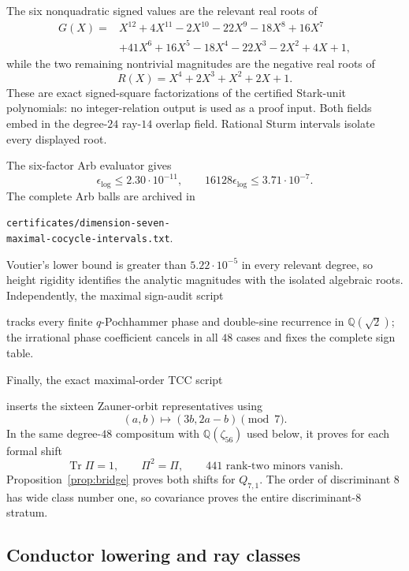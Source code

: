 \documentclass[11pt]{article}
\newcommand{\Tr}{\operatorname{Tr}}
\newcommand{\Q}{\mathbb Q}
\begin{document}
The six nonquadratic signed values are the relevant real roots of
\[
\begin{aligned}
G(X)={}&X^{12}+4X^{11}-2X^{10}-22X^9-18X^8+16X^7\\
 &+41X^6+16X^5-18X^4-22X^3-2X^2+4X+1,
\end{aligned}
\tag{6}
\]
while the two remaining nontrivial magnitudes are the negative real
roots of
\[
 R(X)=X^4+2X^3+X^2+2X+1.
\tag{7}
\]
These are exact signed-square factorizations of the certified
Stark-unit polynomials: no integer-relation output is used as a proof
input.  Both fields embed in the degree-$24$ ray-$14$ overlap field.
Rational Sturm intervals isolate every displayed root.

The six-factor Arb evaluator
 gives
\[
 \epsilon_{\log}\le2.30\cdot10^{-11},\qquad
 16128\epsilon_{\log}\le3.71\cdot10^{-7}.
\tag{8}
\]
The complete Arb balls are archived in
\begin{center}\small
\texttt{certificates/dimension-seven-}\\
\texttt{maximal-cocycle-intervals.txt}.
\end{center}
Voutier's lower bound is greater than $5.22\cdot10^{-5}$ in every
relevant degree, so height rigidity identifies the analytic
magnitudes with the isolated algebraic roots.  Independently, the
maximal sign-audit script
\begin{center}\small
{}
\end{center}
tracks every finite $q$-Pochhammer phase and double-sine recurrence
in $\Q(\sqrt2)$; the irrational phase coefficient cancels in all
$48$ cases and fixes the complete sign table.

Finally, the exact maximal-order TCC script
\begin{center}\small
{}
\end{center}
inserts the sixteen Zauner-orbit representatives using
\[
 (a,b)\longmapsto(3b,2a-b)\pmod7.
\tag{9}
\]
In the same degree-$48$ compositum with $\Q(\zeta_{56})$ used below,
it proves for each formal shift
\[
 \Tr\Pi=1,\qquad \Pi^2=\Pi,\qquad
 441\text{ rank-two minors vanish}.
\tag{10}
\]
Proposition~\ref{prop:bridge} proves both shifts for $Q_{7,1}$.
The order of discriminant $8$ has wide class number one, so covariance
proves the entire discriminant-$8$ stratum.

\subsection{Conductor lowering and ray classes}
\end{document}
